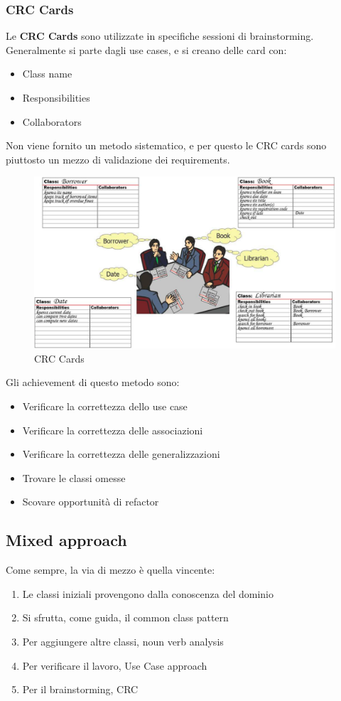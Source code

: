 \documentclass[11pt]{article}
\begin{document}
\subsubsection{CRC Cards}
Le \textbf{CRC Cards} sono utilizzate in specifiche sessioni di brainstorming. Generalmente si parte dagli use cases, e si creano delle card con:
\begin{itemize}
    \item Class name
    \item Responsibilities
    \item Collaborators
\end{itemize}
Non viene fornito un metodo sistematico, e per questo le CRC cards sono piuttosto un mezzo di validazione dei requirements. 
\begin{figure}[H]
    \centering
    \includegraphics[width=\linewidth]{res/teoria/CRCCards.png}
    \caption{CRC Cards}
\end{figure}
Gli achievement di questo metodo sono:
\begin{itemize}
    \item Verificare la correttezza dello use case
    \item Verificare la correttezza delle associazioni
    \item Verificare la correttezza delle generalizzazioni
    \item Trovare le classi omesse
    \item Scovare opportunità di refactor
\end{itemize}
\subsection{Mixed approach}
Come sempre, la via di mezzo è quella vincente:
\begin{enumerate}
    \item Le classi iniziali provengono dalla conoscenza del dominio
    \item Si sfrutta, come guida, il common class pattern
    \item Per aggiungere altre classi, noun verb analysis
    \item Per verificare il lavoro, Use Case approach
    \item Per il brainstorming, CRC
\end{enumerate}
\end{document}
